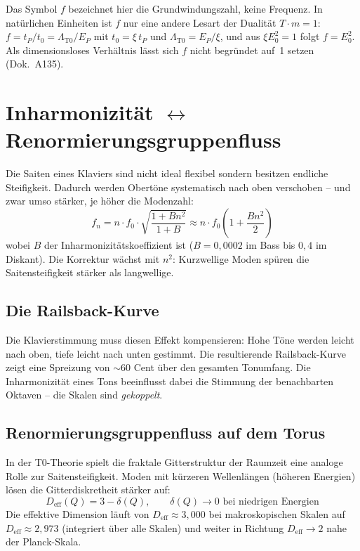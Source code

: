 Das Symbol $f$ bezeichnet hier die Grundwindungszahl, keine Frequenz. In natürlichen Einheiten ist $f$ nur eine andere Lesart der Dualität $T\cdot m = 1$: $f = t_P/t_0 = \Lambda_{\text{T0}}/E_P$ mit $t_0 = \xi\,t_P$ und $\Lambda_{\text{T0}} = E_P/\xi$, und aus $\xi E_0^2 = 1$ folgt $f = E_0^2$. Als dimensionsloses Verhältnis lässt sich $f$ nicht begründet auf~1 setzen (Dok.~A135).

\section{\texorpdfstring{Inharmonizität $\leftrightarrow$ Renormierungsgruppenfluss}{Inharmonizität -- Renormierungsgruppenfluss}}

Die Saiten eines Klaviers sind nicht ideal flexibel sondern besitzen endliche Steifigkeit. Dadurch werden Obertöne systematisch nach oben verschoben -- und zwar umso stärker, je höher die Modenzahl:
\begin{equation}
	f_n = n \cdot f_0 \cdot \sqrt{\frac{1 + B n^2}{1 + B}} \approx n \cdot f_0 \left(1 + \frac{B n^2}{2}\right)
\end{equation}
wobei $B$ der Inharmonizitätskoeffizient ist ($B = 0{,}0002$ im Bass bis $0{,}4$ im Diskant). Die Korrektur wächst mit $n^2$: Kurzwellige Moden spüren die Saitensteifigkeit stärker als langwellige.

\subsection{Die Railsback-Kurve}

Die Klavierstimmung muss diesen Effekt kompensieren: Hohe Töne werden leicht nach oben, tiefe leicht nach unten gestimmt. Die resultierende Railsback-Kurve zeigt eine Spreizung von $\sim$60 Cent über den gesamten Tonumfang. Die Inharmonizität eines Tons beeinflusst dabei die Stimmung der benachbarten Oktaven -- die Skalen sind \emph{gekoppelt}.

\subsection{Renormierungsgruppenfluss auf dem Torus}

In der T0-Theorie spielt die fraktale Gitterstruktur der Raumzeit eine analoge Rolle zur Saitensteifigkeit. Moden mit kürzeren Wellenlängen (höheren Energien) lösen die Gitterdiskretheit stärker auf:
\begin{equation}
	D_\text{eff}(Q) = 3 - \delta(Q), \qquad \delta(Q) \to 0 \text{ bei niedrigen Energien}
\end{equation}
Die effektive Dimension läuft von $D_\text{eff} \approx 3{,}000$ bei makroskopischen Skalen auf $D_\text{eff} \approx 2{,}973$ (integriert über alle Skalen) und weiter in Richtung $D_\text{eff} \to 2$ nahe der Planck-Skala.

